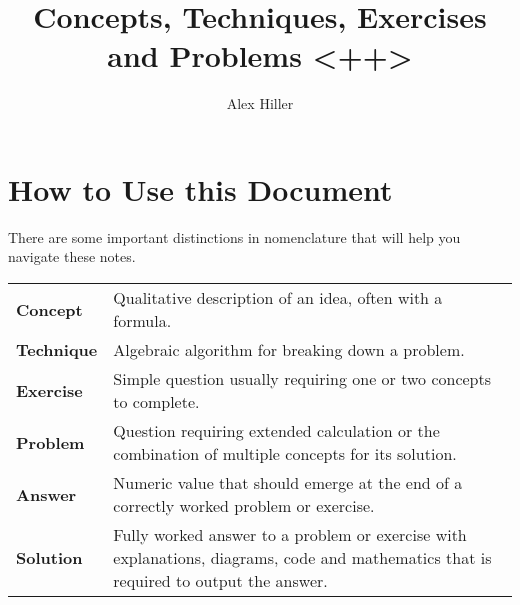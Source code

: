 \documentclass{article}
\author{Alex Hiller}
\title{Concepts, Techniques, Exercises and Problems <++>}
\newcounter{concepts}
\newcommand{\btab}[1]{\begin{table}[!h] \begin{center} \begin{tabular}{#1}}
\newcommand{\etab}{ \end{tabular} \end{center} \end{table}}
\newcommand{\s}[1]{\section{#1}}
\begin{document}
\maketitle
\clearpage
\tableofcontents
\clearpage

\s{How to Use this Document}
There are some important distinctions in nomenclature that will help you navigate these notes.

\btab{p{}p{}}
 \textbf{Concept}   & Qualitative description of an idea, often with a formula. \vspace{3mm} \\
 \textbf{Technique} & Algebraic algorithm for breaking down a problem. \vspace{3mm} \\ 
 \textbf{Exercise}  & Simple question usually requiring one or two concepts
   to complete. \vspace{3mm} \\  
 \textbf{Problem}   & Question requiring extended calculation or the combination of 
   multiple concepts for its solution.\vspace{3mm} \\ 
 \textbf{Answer}    & Numeric value that should emerge at the end of a 
   correctly worked problem or exercise.\vspace{3mm}  \\
 \textbf{Solution}  & Fully worked answer to a problem or exercise with explanations, 
  diagrams, code and mathematics that is required to output the answer. \vspace{3mm} \\ 
\etab

\clearpage
\end{document}
